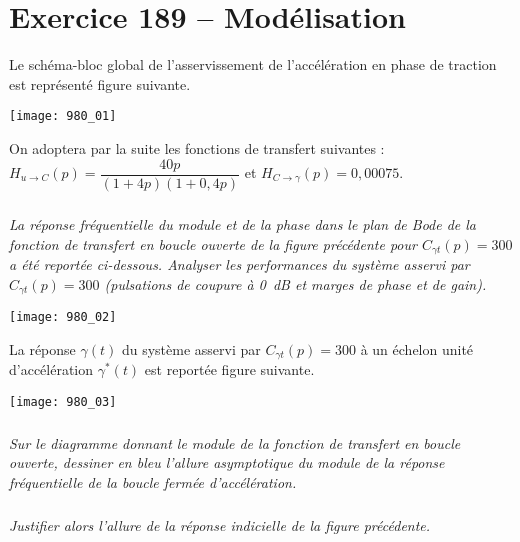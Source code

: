 \section*{Exercice 189 -- Modélisation}
\setcounter{exo}{0}


Le schéma-bloc global de l’asservissement de l’accélération en phase de traction est représenté figure suivante. 


\begin{center}
\texttt{[image: 980\_01]}%
\end{center}

On adoptera par la suite les fonctions de transfert suivantes : $H_{u\rightarrow C}(p)=\dfrac{40p}{\left( 1+4p\right)\left(1+0,4 p \right)}$ et $H_{C\rightarrow \gamma}(p)=0,00075$.

\subparagraph{}
\textit{La réponse fréquentielle du module et de la phase dans le plan de Bode de la fonction de
transfert en boucle ouverte de la figure précédente pour $C_{\gamma t} ( p) = 300 $  a été reportée ci-dessous.
Analyser les performances du système asservi par $C_{\gamma t} (p) = 300 $ (pulsations de coupure
à \SI{0}{dB} et marges de phase et de gain).}
\ifprof
\begin{corrige}
\end{corrige}
\else
\fi

\begin{center}
\texttt{[image: 980\_02]}%
\end{center}

La réponse $\gamma(t)$ du système asservi par $C_{\gamma t} ( p) = 300$ à un échelon unité d’accélération $\gamma^* (t)$ est reportée figure suivante.

\begin{center}
\texttt{[image: 980\_03]}%
\end{center}

\subparagraph{}
\textit{Sur le diagramme donnant le module de la fonction de transfert en boucle
ouverte, dessiner en bleu l’allure asymptotique du module de la réponse fréquentielle de la boucle
fermée d’accélération.}
\ifprof
\begin{corrige}
\end{corrige}
\else
\fi

\subparagraph{}
\textit{Justifier alors l’allure de la réponse indicielle de la figure précédente.}
\ifprof
\begin{corrige}
\end{corrige}
\else
\fi

